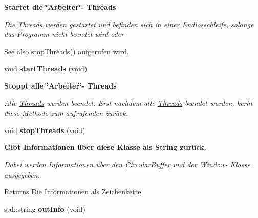 \begin{Indent}{\bf Startet die \char`\"{}\+Arbeiter\char`\"{}-\/ Threads}\par
{\em Die \hyperlink{classrc_1_1Threads}{Threads} werden gestartet und befinden sich in einer Endlosschleife, solange das Programm nicht beendet wird oder

\begin{DoxySeeAlso}{See also}
stop\+Threads() aufgerufen wird. 
\end{DoxySeeAlso}
}\begin{DoxyCompactItemize}
\item 
\hypertarget{classrc_1_1DetectorFactory_af17a8bc76295ecf266db4fc889e86789}{void {\bfseries start\+Threads} (void)}\label{classrc_1_1DetectorFactory_af17a8bc76295ecf266db4fc889e86789}

\end{DoxyCompactItemize}
\end{Indent}
\begin{Indent}{\bf Stoppt alle \char`\"{}\+Arbeiter\char`\"{}-\/ Threads}\par
{\em Alle \hyperlink{classrc_1_1Threads}{Threads} werden beendet. Erst nachdem alle \hyperlink{classrc_1_1Threads}{Threads} beendet wurden, kerht diese Methode zum aufrufenden zurück. }\begin{DoxyCompactItemize}
\item 
\hypertarget{classrc_1_1DetectorFactory_a153ff92097336849ae78ea4a8216b4a3}{void {\bfseries stop\+Threads} (void)}\label{classrc_1_1DetectorFactory_a153ff92097336849ae78ea4a8216b4a3}

\end{DoxyCompactItemize}
\end{Indent}
\begin{Indent}{\bf Gibt Informationen über diese Klasse als String zurück.}\par
{\em Dabei werden Informationen über den \hyperlink{classrc_1_1CircularBuffer}{Circular\+Buffer} und der Window-\/ Klasse ausgegeben.

\begin{DoxyReturn}{Returns}
Die Informationen als Zeichenkette. 
\end{DoxyReturn}
}\begin{DoxyCompactItemize}
\item 
\hypertarget{classrc_1_1DetectorFactory_adea364916607f577ca33028fdd5cf330}{std\+::string {\bfseries out\+Info} (void)}\label{classrc_1_1DetectorFactory_adea364916607f577ca33028fdd5cf330}

\end{DoxyCompactItemize}
\end{Indent}

